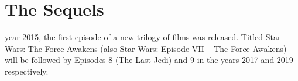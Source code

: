 \part{The Sequels}
        \label{part:sequels}%



 year 2015, the first episode of a new trilogy of films was
released. Titled Star Wars: The Force Awakens (also Star Wars: Episode VII – The Force Awakens)
will be followed by Episodes 8 (The Last Jedi) and 9 in the years 2017 and 2019 respectively.
